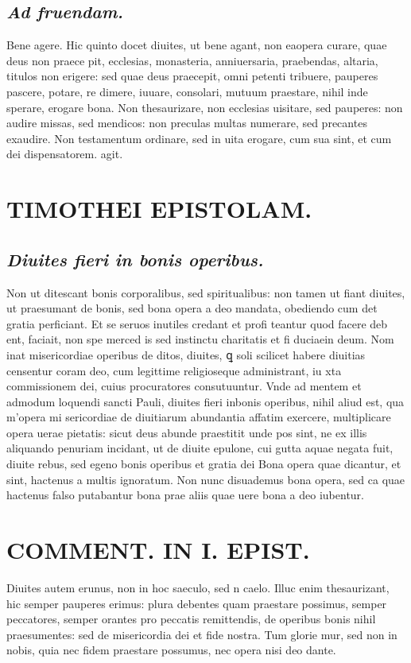 \documentclass{article}
\begin{document}
\begin{pages}
\subsection*{\textit{Ad fruendam. }}\pstart Bene agere. Hic quinto docet diuites, ut bene agant, non eaopera curare, quae deus non praece pit, ecclesias, monasteria, anniuersaria, praebendas, altaria, titulos non erigere: sed quae deus praecepit, omni petenti tribuere, pauperes pascere, potare, re dimere, iuuare, consolari, mutuum praestare, nihil inde sperare, erogare bona. Non thesaurizare, non ecclesias uisitare, sed pauperes: non audire missas, sed mendicos: non preculas multas numerare, sed precantes exaudire. Non testamentum ordinare, sed in uita erogare, cum sua sint, et cum dei dispensatorem. agit.  \pend
\section*{TIMOTHEI EPISTOLAM. }
\marginpar{[ p.183 ]}
{}
\subsection*{\textit{Diuites fieri in bonis operibus. }}\pstart Non ut ditescant bonis corporalibus, sed spiritualibus: non tamen ut fiant diuites, ut praesumant de bonis, sed bona opera a deo mandata, obediendo cum det gratia perficiant. Et se seruos inutiles credant et profi teantur quod facere deb ent, faciait, non spe merced is sed instinctu charitatis et fi duciaein deum. Nom inat misericordiae operibus de ditos, diuites, ꝗ soli scilicet habere diuitias censentur coram deo, cum legittime religioseque administrant, iu xta commissionem dei, cuius procuratores consutuuntur. Vnde ad mentem et admodum loquendi sancti Pauli, diuites fieri inbonis operibus, nihil aliud est, qua m'opera mi sericordiae de diuitiarum abundantia affatim exercere, multiplicare opera uerae pietatis: sicut deus abunde praestitit unde pos sint, ne ex illis aliquando penuriam incidant, ut de diuite epulone, cui gutta aquae negata fuit, diuite rebus, sed egeno bonis operibus et gratia dei  \pend\pstart Bona opera quae dicantur, et sint, hactenus a multis ignoratum. Non nunc disuademus bona opera, sed ca quae hactenus falso putabantur bona prae aliis quae uere bona a deo iubentur.  \pend
\section*{COMMENT. IN I. EPIST. }
\marginpar{[ p.184 ]}\pstart Diuites autem erunus, non in hoc saeculo, sed n caelo. Illuc enim thesaurizant, hic semper pauperes erimus: plura debentes quam praestare possimus, semper peccatores, semper orantes pro peccatis remittendis, de operibus bonis nihil praesumentes: sed de misericordia dei et fide nostra. Tum glorie mur, sed non in nobis, quia nec fidem praestare possumus, nec opera nisi deo dante.  \pend
{}
{}

\end{pages}
\end{document}
